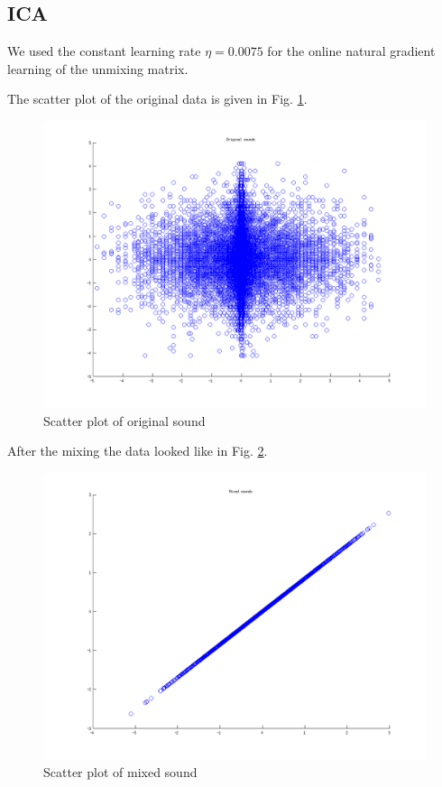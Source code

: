 \documentclass{article}
\begin{document}
	\subsection{ICA}
		We used the constant learning rate $\eta=0.0075$ for the online natural gradient learning of the unmixing matrix.
		
		The scatter plot of the original data is given in Fig. \ref{fig:origSound}.
		\begin{figure}[H]
			\centering
			\includegraphics[width=12cm]{origSound.png}
			\caption{Scatter plot of original sound}
			\label{fig:origSound}
		\end{figure}
		
		After the mixing the data looked like in Fig. \ref{fig:mixSound}.
		\begin{figure}[H]
			\centering
			\includegraphics[width=12cm]{mixSound.png}
			\caption{Scatter plot of mixed sound}
			\label{fig:mixSound}
		\end{figure}
		
\end{document}
